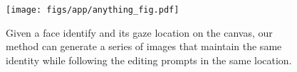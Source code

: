 \begin{figure}[H]
  \centering
  \texttt{[image: figs/app/anything\_fig.pdf]}
  \caption{Given a face identify and its gaze location on the canvas, our method can generate a series of images that maintain the same identity while following the editing prompts in the same location.}
  \label{fig:anything}
\end{figure}